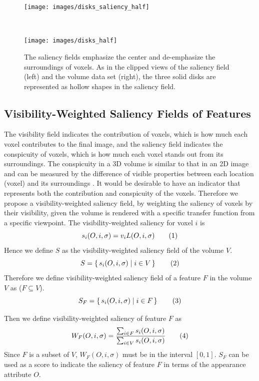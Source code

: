 \begin{figure}
	\centering
	\begin{minipage}{.15\textwidth}
		\texttt{[image: images/disks\_saliency\_half]}
	\end{minipage}~
	\begin{minipage}{.15\textwidth}
		\texttt{[image: images/disks\_half]}
	\end{minipage}
	\caption{The saliency fields emphasize the center and de-emphasize the surroundings of voxels. As in the clipped views of the saliency field (left) and the volume data set (right), the three solid disks are represented as hollow shapes in the saliency field.}
	\label{fig:disks_saliency_half}
\end{figure}

\subsection{Visibility-Weighted Saliency Fields of Features \label{visibility_weighted_saliency}}
The visibility field indicates the contribution of voxels, which is how much each voxel contributes to the final image, and the saliency field indicates the conspicuity of voxels, which is how much each voxel stands out from its surroundings.
The conspicuity in a 3D volume is similar to that in an 2D image and can be measured by the difference of visible properties between each location (voxel) and its surroundings \cite{duan_visual_2011}.
It would be desirable to have an indicator that represents both the contribution and conspicuity of the voxels.
Therefore we propose a visibility-weighted saliency field, by weighting the saliency of voxels by their visibility, given the volume is rendered with a specific transfer function from a specific viewpoint.
The visibility-weighted saliency for voxel $ i $ is
\[ s_{i}(O,i,\sigma)= v_{i} L(O,i,\sigma)
\addtag \]
Hence we define $ S $ as the visibility-weighted saliency field of the volume $ V $.
\[ S=\set{s_{i}(O,i,\sigma)|i \in V} 
\addtag \]
Therefore we define visibility-weighted saliency field of a feature $ F $ in the volume $ V $ as ($ F\subseteq V $).
\[ S_{F}=\set{s_{i}(O,i,\sigma)|i \in F} 
\addtag \]

Then we define visibility-weighted saliency of feature $ F $ as
\[ W_{F}(O,i,\sigma)=\frac{\sum_{i \in F}{s_{i}(O,i,\sigma)}}{\sum_{i \in V}{s_{i}(O,i,\sigma)}} 
\addtag \]
Since $ F $ is a subset of $ V $, $ W_{F}(O,i,\sigma) $ must be in the interval $ [0,1] $.
$ S_{F} $ can be used as a score to indicate the saliency of feature $ F $ in terms of the appearance attribute $ O $.


